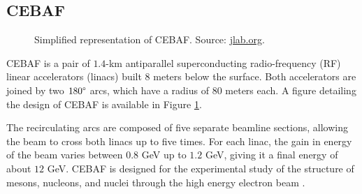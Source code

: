 \subsection{CEBAF} \label{ssec::cebaf}
    \begin{figure}[b!]
        \centering{}
        \caption[CEBAF.]{Simplified representation of CEBAF.
        Source: \hyperlink{https://www.jlab.org/}{jlab.org}.}
        \label{fig::cebaf}
    \end{figure}
    
    CEBAF is a pair of $1.4$-km antiparallel superconducting radio-frequency (RF) linear accelerators (linacs) built 8 meters below the surface.
    Both accelerators are joined by two $180\degree$ arcs, which have a radius of $80$ meters \cite{leemann2001} each.
    A figure detailing the design of CEBAF is available in Figure \ref{fig::cebaf}.

    The recirculating arcs are composed of five separate beamline sections, allowing the beam to cross both linacs up to five times.
    For each linac, the gain in energy of the beam varies between $0.8$ GeV up to $1.2$ GeV, giving it a final energy of about $12$ GeV.
    CEBAF is designed for the experimental study of the structure of mesons, nucleons, and nuclei through the high energy electron beam \cite{rode2010}.
